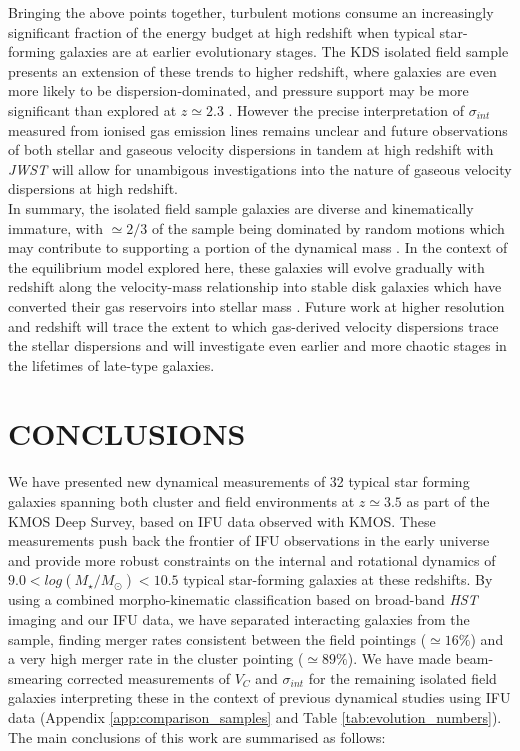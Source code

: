 \documentclass[fleqn,usenatbib]{mnras}
\begin{document}
Bringing the above points together, turbulent motions consume an increasingly significant fraction of the energy budget at high redshift when typical star-forming galaxies are at earlier evolutionary stages.
The KDS isolated field sample presents an extension of these trends to higher redshift, where galaxies are even more likely to be dispersion-dominated, and pressure support may be more significant than explored at $z\simeq2.3$ \citep{Wuyts2016b,Ubler2017,Genzel2017,Lang2017}.    
However the precise interpretation of $\sigma_{int}$ measured from ionised gas emission lines remains unclear and future observations of both stellar and gaseous velocity dispersions in tandem at high redshift with {\it JWST} will allow for unambigous investigations into the nature of gaseous velocity dispersions at high redshift. \\

\noindent
In summary, the isolated field sample galaxies are diverse and kinematically immature, with $\simeq2/3$ of the sample being dominated by random motions which may contribute to supporting a portion of the dynamical mass \citep[e.g.][]{Kassin2007,Burkert2010,Kassin2012,Newman2013,Straatman2017,Ubler2017,Lang2017}.
In the context of the equilibrium model explored here, these galaxies will evolve gradually with redshift along the velocity-mass relationship into stable disk galaxies which have converted their gas reservoirs into stellar mass \citep[e.g.][]{Lilly2013,Tacconi2013,Wisnioski2015,Tacconi2017}. 
Future work at higher resolution and redshift will trace the extent to which gas-derived velocity dispersions trace the stellar dispersions and will investigate even earlier and more chaotic stages in the lifetimes of late-type galaxies.

\section{CONCLUSIONS}\label{sec:conclusion}
We have presented new dynamical measurements of 32 typical star forming galaxies spanning both cluster and field environments at $z\simeq3.5$ as part of the KMOS Deep Survey, based on IFU data observed with KMOS.
These measurements push back the frontier of IFU observations in the early universe and provide more robust constraints on the internal and rotational dynamics of $9.0 < log(M_{\star}/M_{\odot})< 10.5$ typical star-forming galaxies at these redshifts.
By using a combined morpho-kinematic classification based on broad-band {\em HST} imaging and our IFU data, we have separated interacting galaxies from the sample, finding merger rates consistent between the field pointings ($\simeq16\%$) and a very high merger rate in the cluster pointing ($\simeq89\%$).
We have made beam-smearing corrected measurements of $V_{C}$ and $\sigma_{int}$ for the remaining isolated field galaxies interpreting these in the context of previous dynamical studies using IFU data (Appendix \ref{app:comparison_samples} and Table \ref{tab:evolution_numbers}).
The main conclusions of this work are summarised as follows:
\end{document}
